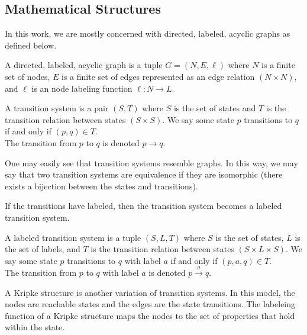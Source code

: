 \subsection{Mathematical Structures}

In this work, we are mostly concerned with directed, labeled, acyclic graphs as defined below. 

\begin{definition}
    A directed, labeled, acyclic graph is a tuple $ G = (N, E, \ell)$ where $N$ is a finite set of nodes, $E$ is a finite set of edges represented as an edge relation $( N \times N)$, and $\ell$ is an node labeling function $\ell : N \rightarrow L$. 
\end{definition}

\begin{definition}
    A transition system is a pair $(S,T)$ where $S$ is the set of states and $T$ is the transition relation between states $ ( S \times S )$. We say some state $p$ transitions to $q$ if and only if $(p,q) \in T$. \\ The transition from $p$ to $q$ is denoted $ p \rightarrow q $.
\end{definition}

One may easily see that transition systems resemble graphs. In this way, we may say that two transition systems are equivalence if they are isomorphic (there exists a bijection between the states and transitions).  

If the transitions have labeled, then the transition system becomes a labeled transition system. 

\begin{definition}
    A labeled transition system is a tuple $(S, L, T)$ where $S$ is the set of states, $L$ is the set of labels, and $T$ is the transition relation between states $ ( S \times L \times S )$. We say some state $p$ transitions to $q$ with label $a$ if and only if $(p,a,q) \in T$. \\ The transition from $p$ to $q$ with label $a$ is denoted $ p \xrightarrow{a} q $.
\end{definition}

A Kripke structure is another variation of transition systems. In this model, the nodes are reachable states and the edges are the state transitions. The labeleing function of a Kripke structure maps the nodes to the set of properties that hold within the state. 

